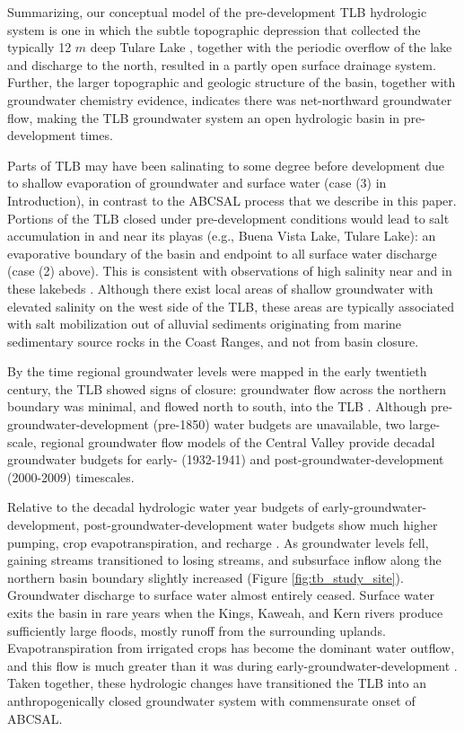 Summarizing, our conceptual model of the pre-development TLB hydrologic system is one in which the subtle topographic depression that collected the typically 12 $m$ deep Tulare Lake \citep{preston1990tulare}, together with the periodic overflow of the lake and discharge to the north, resulted in a partly open surface drainage system. Further, the larger topographic and geologic structure of the basin, together with groundwater chemistry evidence, indicates there was net-northward groundwater flow, making the TLB groundwater system an open hydrologic basin in pre-development times.

Parts of TLB may have been salinating to some degree before development due to shallow evaporation of groundwater and surface water (case (3) in Introduction), in contrast to the ABCSAL process that we describe in this paper. Portions of the TLB closed under pre-development conditions would lead to salt accumulation in and near its playas (e.g., Buena Vista Lake, Tulare Lake): an evaporative boundary of the basin and endpoint to all surface water discharge (case (2) above). This is consistent with observations of high salinity near and in these lakebeds \citep{Hansen2018, Fujii1995}. Although there exist local areas of shallow groundwater with elevated salinity on the west side of the TLB, these areas are typically associated with salt mobilization out of alluvial sediments originating from marine sedimentary source rocks in the Coast Ranges, and not from basin closure.

By the time regional groundwater levels were mapped in the early twentieth century, the TLB showed signs of closure: groundwater flow across the northern boundary was minimal, and flowed north to south, into the TLB \citep{mendenhall1916ground, ingerson1941hydrology}. Although pre-groundwater-development (pre-1850) water budgets are unavailable, two large-scale, regional groundwater flow models of the Central Valley \citep{Brush2013, Faunted.2009} provide decadal groundwater budgets for early- (1932-1941) and post-groundwater-development (2000-2009) timescales.

Relative to the decadal hydrologic water year budgets of early-groundwater-development, post-groundwater-development water budgets show much higher pumping, crop evapotranspiration, and recharge \citep{Brush2013}. As groundwater levels fell, gaining streams transitioned to losing streams, and subsurface inflow along the northern basin boundary slightly increased (Figure \ref{fig:tb_study_site}). Groundwater discharge to surface water almost entirely ceased. Surface water exits the basin in rare years when the Kings, Kaweah, and Kern rivers produce sufficiently large floods, mostly runoff from the surrounding uplands. Evapotranspiration from irrigated crops has become the dominant water outflow, and this flow is much greater than it was during early-groundwater-development \citep{Brush2013}. Taken together, these hydrologic changes have transitioned the TLB into an anthropogenically closed groundwater system with commensurate onset of ABCSAL.  




